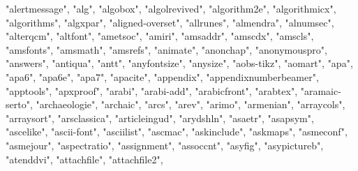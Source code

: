 \documentclass[
]{article}
\newenvironment{Shaded}{\begin{snugshade}}{\end{snugshade}}
\newcommand{\NormalTok}[1]{#1}
\newcommand{\StringTok}[1]{\textcolor[rgb]{0.31,0.60,0.02}{#1}}
\begin{document}
\begin{Shaded}
\begin{Highlighting}[]
\StringTok{"alertmessage"}\NormalTok{, }\StringTok{"alg"}\NormalTok{, }\StringTok{"algobox"}\NormalTok{, }\StringTok{"algolrevived"}\NormalTok{, }\StringTok{"algorithm2e"}\NormalTok{, }
\StringTok{"algorithmicx"}\NormalTok{, }\StringTok{"algorithms"}\NormalTok{, }\StringTok{"algxpar"}\NormalTok{, }\StringTok{"aligned{-}overset"}\NormalTok{, }\StringTok{"allrunes"}\NormalTok{, }
\StringTok{"almendra"}\NormalTok{, }\StringTok{"alnumsec"}\NormalTok{, }\StringTok{"alterqcm"}\NormalTok{, }\StringTok{"altfont"}\NormalTok{, }\StringTok{"ametsoc"}\NormalTok{, }\StringTok{"amiri"}\NormalTok{, }
\StringTok{"amsaddr"}\NormalTok{, }\StringTok{"amscdx"}\NormalTok{, }\StringTok{"amscls"}\NormalTok{, }\StringTok{"amsfonts"}\NormalTok{, }\StringTok{"amsmath"}\NormalTok{, }\StringTok{"amsrefs"}\NormalTok{, }
\StringTok{"animate"}\NormalTok{, }\StringTok{"anonchap"}\NormalTok{, }\StringTok{"anonymouspro"}\NormalTok{, }\StringTok{"answers"}\NormalTok{, }\StringTok{"antiqua"}\NormalTok{, }
\StringTok{"antt"}\NormalTok{, }\StringTok{"anyfontsize"}\NormalTok{, }\StringTok{"anysize"}\NormalTok{, }\StringTok{"aobs{-}tikz"}\NormalTok{, }\StringTok{"aomart"}\NormalTok{, }\StringTok{"apa"}\NormalTok{, }
\StringTok{"apa6"}\NormalTok{, }\StringTok{"apa6e"}\NormalTok{, }\StringTok{"apa7"}\NormalTok{, }\StringTok{"apacite"}\NormalTok{, }\StringTok{"appendix"}\NormalTok{, }\StringTok{"appendixnumberbeamer"}\NormalTok{, }
\StringTok{"apptools"}\NormalTok{, }\StringTok{"apxproof"}\NormalTok{, }\StringTok{"arabi"}\NormalTok{, }\StringTok{"arabi{-}add"}\NormalTok{, }\StringTok{"arabicfront"}\NormalTok{, }
\StringTok{"arabtex"}\NormalTok{, }\StringTok{"aramaic{-}serto"}\NormalTok{, }\StringTok{"archaeologie"}\NormalTok{, }\StringTok{"archaic"}\NormalTok{, }\StringTok{"arcs"}\NormalTok{, }
\StringTok{"arev"}\NormalTok{, }\StringTok{"arimo"}\NormalTok{, }\StringTok{"armenian"}\NormalTok{, }\StringTok{"arraycols"}\NormalTok{, }\StringTok{"arraysort"}\NormalTok{, }\StringTok{"arsclassica"}\NormalTok{, }
\StringTok{"articleingud"}\NormalTok{, }\StringTok{"arydshln"}\NormalTok{, }\StringTok{"asaetr"}\NormalTok{, }\StringTok{"asapsym"}\NormalTok{, }\StringTok{"ascelike"}\NormalTok{, }
\StringTok{"ascii{-}font"}\NormalTok{, }\StringTok{"asciilist"}\NormalTok{, }\StringTok{"ascmac"}\NormalTok{, }\StringTok{"askinclude"}\NormalTok{, }\StringTok{"askmaps"}\NormalTok{, }
\StringTok{"asmeconf"}\NormalTok{, }\StringTok{"asmejour"}\NormalTok{, }\StringTok{"aspectratio"}\NormalTok{, }\StringTok{"assignment"}\NormalTok{, }\StringTok{"assoccnt"}\NormalTok{, }
\StringTok{"asyfig"}\NormalTok{, }\StringTok{"asypictureb"}\NormalTok{, }\StringTok{"atenddvi"}\NormalTok{, }\StringTok{"attachfile"}\NormalTok{, }\StringTok{"attachfile2"}\NormalTok{, }

\end{Highlighting}
\end{Shaded}
\end{document}
